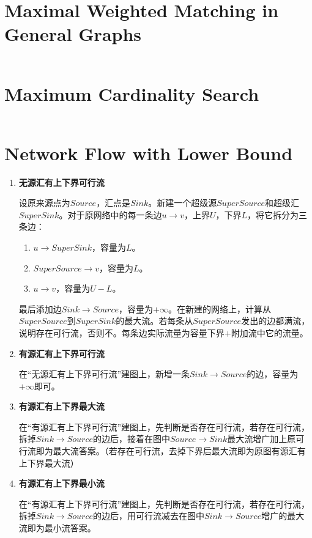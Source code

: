 \documentclass[a4paper,openany]{book}
\newcommand{\cppcode}[1]
{
  \inputminted[mathescape,
  tabsize=4,
  linenos,
  framesep=2mm,
  breakaftergroup=true,
  breakautoindent=true,
  breakbytoken=true,
  breaklines=true,
  fontsize=\small
  ]{cpp}{source/#1}
}
\begin{document}
\section{Maximal Weighted  Matching in General Graphs}
\cppcode{/Graph Theory/Maximal Weighted  Matching in General Graphs.cpp}
\section{Maximum Cardinality Search}
\cppcode{/Graph Theory/Maximum Cardinality Search.cpp}
\section{Network Flow with Lower Bound}
\begin{enumerate}[1.]
\item \textbf{无源汇有上下界可行流}
  
  设原来源点为$Source$，汇点是$Sink$。新建一个超级源$SuperSource$和超级汇$SuperSink$。对于原网络中的每一条边$u \rightarrow v$，上界$U$，下界$L$，将它拆分为三条边：
  \begin{enumerate}[(1)]
  \item $u \rightarrow SuperSink$，容量为$L$。
  \item $SuperSource \rightarrow v$，容量为$L$。
  \item $u \rightarrow v$，容量为$U-L$。
  \end{enumerate}
  最后添加边$Sink \rightarrow Source$，容量为$+\infty$。在新建的网络上，计算从$SuperSource$到$SuperSink$的最大流。若每条从$SuperSource$发出的边都满流，说明存在可行流，否则不。每条边实际流量为容量下界$+$附加流中它的流量。
\item \textbf{有源汇有上下界可行流}
  
  在``无源汇有上下界可行流''建图上，新增一条$Sink \rightarrow Source$的边，容量为$+\infty$即可。
\item \textbf{有源汇有上下界最大流}
  
  在``有源汇有上下界可行流''建图上，先判断是否存在可行流，若存在可行流，拆掉$Sink \rightarrow Source$的边后，接着在图中$Source \rightarrow Sink$最大流增广加上原可行流即为最大流答案。（若存在可行流，去掉下界后最大流即为原图有源汇有上下界最大流）
\item \textbf{有源汇有上下界最小流}
  
  在``有源汇有上下界可行流''建图上，先判断是否存在可行流，若存在可行流，拆掉$Sink \rightarrow Source$的边后，用可行流减去在图中$Sink \rightarrow Source$增广的最大流即为最小流答案。
\end{enumerate}
\end{document}
